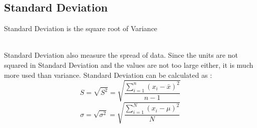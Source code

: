 \documentclass[twoside,12pt]{report}  %
\begin{document}
\subsection{Standard Deviation}
\begin{tcolorbox}[colback=red!5!white, colframe=red!75!black, title = \textbf{Standard Deviation}]
	Standard Deviation is the square root of Variance
\end{tcolorbox}
\noindent
\\
Standard Deviation also measure the spread of data. Since the units are not squared in Standard Deviation and the values are not too large either, it is much more used than variance.
Standard Deviation can be calculated as : 
$$ S = \sqrt{S^2} = \sqrt{\frac{\sum_{i=1}^{n} ( x_i - \bar{x} )^2} {n - 1}} $$
$$ \sigma = \sqrt{\sigma^2} = \sqrt{\frac{\sum_{i=1}^{N} (x_i - \mu)^2} {N}} $$
\end{document}
